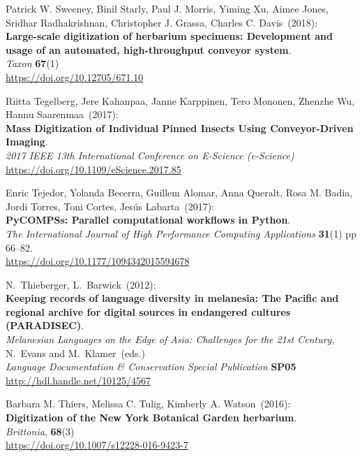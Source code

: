 \begin{thebibliography}{9}
Patrick W. Sweeney, Binil Starly, Paul J. Morris, Yiming Xu, Aimee Jones, Sridhar Radhakrishnan, Christopher J. Grassa, Charles C. Davis~(2018):\\
\textbf{Large-scale digitization of herbarium specimens: Development and usage of an
automated, high-throughput conveyor system}.\\
\emph{Taxon} \textbf{67}(1)\\
\url{https://doi.org/10.12705/671.10}

Riitta Tegelberg, Jere Kahanpaa, Janne Karppinen, Tero Mononen, Zhenzhe Wu, Hannu Saarenmaa~(2017):\\
\textbf{Mass Digitization of Individual Pinned Insects Using Conveyor-Driven Imaging}.\\
\emph{2017 IEEE 13th International Conference on E-Science (e-Science)}\\
\url{https://doi.org/10.1109/eScience.2017.85}

Enric Tejedor, Yolanda Becerra, Guillem Alomar, Anna Queralt,
Rosa M. Badia, Jordi Torres, Toni Cortes, Jesús Labarta~(2017):\\
\textbf{PyCOMPSs: Parallel computational workflows in Python}.\\
\emph{The International Journal of High Performance Computing Applications}
\textbf{31}(1) pp 66--82.\\
\url{https://doi.org/10.1177/1094342015594678}


N.~Thieberger, L.~Barwick~(2012):\\
\textbf{Keeping records of language diversity in melanesia: The Pacific
and regional archive for digital sources in endangered cultures
(PARADISEC)}.\\
\emph{Melanesian Languages on the Edge of Asia:
Challenges for the 21st Century}, N.~Evans and M.~Klamer~(eds.)\\
\emph{Language Documentation \& Conservation Special Publication}
\textbf{SP05} \\
\url{http://hdl.handle.net/10125/4567}

Barbara M. Thiers, Melissa C. Tulig, Kimberly A. Watson~(2016):\\
\textbf{Digitization of the New York Botanical Garden herbarium}.\\
\emph{Brittonia}, \textbf{68}(3)\\
\url{https://doi.org/10.1007/s12228-016-9423-7}



\end{thebibliography}
